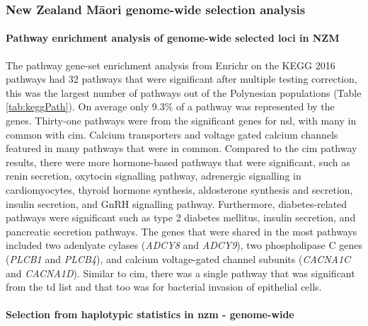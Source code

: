 \documentclass[twoside,openright]{report}
\let\oldparagraph\paragraph
\renewcommand{\paragraph}[1]{\oldparagraph{#1}\mbox{}}
\newcommand{\tex}[1]{#1}
\begin{document}
\subsubsection{\texorpdfstring{New Zealand M\tex{\={a}}ori genome-wide
selection
analysis}{New Zealand Mori genome-wide selection analysis}}\label{new-zealand-mori-genome-wide-selection-analysis}

\paragraph{Pathway enrichment analysis of genome-wide selected loci in
NZM}\label{nzmPath}

The pathway gene-set enrichment analysis from Enrichr on the KEGG 2016
pathways had 32 pathways that were significant after multiple testing
correction, this was the largest number of pathways out of the
Polynesian populations (Table \ref{tab:keggPath}). On average only 9.3\%
of a pathway was represented by the genes. Thirty-one pathways were from
the significant genes for \gls{nsl}, with many in common with \gls{cim}.
Calcium transporters and voltage gated calcium channels featured in many
pathways that were in common. Compared to the \gls{cim} pathway results,
there were more hormone-based pathways that were significant, such as
renin secretion, oxytocin signalling pathway, adrenergic signalling in
cardiomyocytes, thyroid hormone synthesis, aldosterone synthesis and
secretion, insulin secretion, and GnRH signalling pathway. Furthermore,
diabetes-related pathways were significant such as type 2 diabetes
mellitus, insulin secretion, and pancreatic secretion pathways. The
genes that were shared in the most pathways included two adenlyate
cylases (\emph{ADCY8} and \emph{ADCY9}), two phospholipase C genes
(\emph{PLCB1} and \emph{PLCB4}), and calcium voltage-gated channel
subunits (\emph{CACNA1C} and \emph{CACNA1D}). Similar to \gls{cim},
there was a single pathway that was significant from the \gls{td} list
and that too was for bacterial invasion of epithelial cells.

\paragraph{\texorpdfstring{Selection from haplotypic statistics in
\gls{nzm} -
genome-wide}{Selection from haplotypic statistics in  - genome-wide}}\label{selection-from-haplotypic-statistics-in---genome-wide}
\end{document}
